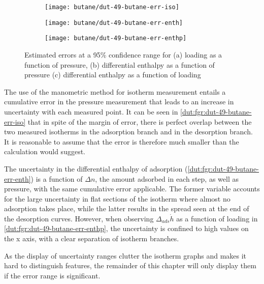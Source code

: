 \begin{figure}[htb]
    \centering
    \begin{subfigure}{0.33\linewidth}
        \texttt{[image: butane/dut-49-butane-err-iso]}%
        \caption{}\label{dut:fgr:dut-49-butane-err-iso}
    \end{subfigure}%
    \begin{subfigure}{0.33\linewidth}
        \texttt{[image: butane/dut-49-butane-err-enth]}%
        \caption{}\label{dut:fgr:dut-49-butane-err-enth}
    \end{subfigure}%
    \begin{subfigure}{0.33\linewidth}
        \texttt{[image: butane/dut-49-butane-err-enthp]}%
        \caption{}\label{dut:fgr:dut-49-butane-err-enthp}
    \end{subfigure}%
    \caption{Estimated errors at a 95\% confidence range for 
    (a) loading as a function of pressure, 
    (b) differential enthalpy as a function of pressure 
    (c) differential enthalpy as a function of loading}%
    \label{dut:fgr:dut-49-butane-err}
\end{figure}

The use of the manometric method for isotherm measurement entails a 
cumulative error in the pressure measurement that leads to an increase
in uncertainty with each measured point. It can be seen in 
\autoref{dut:fgr:dut-49-butane-err-iso} that in spite of the margin of 
error, there is perfect overlap between the two measured isotherms
in the adsorption branch and in the desorption branch. It is reasonable
to assume that the error is therefore much smaller than the calculation 
would suggest.

The uncertainty in the differential enthalpy of adsorption 
(\autoref{dut:fgr:dut-49-butane-err-enth}) is a 
function of \(\Delta n\), the amount adsorbed in each step, as well
as pressure, with the same cumulative error applicable. The former 
variable accounts for the large uncertainty in flat sections of 
the isotherm where almost no adsorption takes place, while the latter
results in the spread seen at the end of the desorption curves. 
However, when observing \(\Delta_{ads} \dot{h}\) as a function of 
loading in \autoref{dut:fgr:dut-49-butane-err-enthp}, the uncertainty 
is confined to high values on the x axis, with a clear separation
of isotherm branches.

As the display of uncertainty ranges clutter the isotherm graphs and 
makes it hard to distinguish features, the remainder of this chapter 
will only display them if the error range is significant.